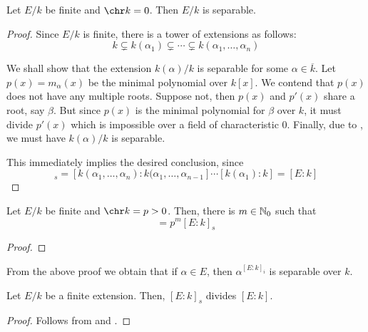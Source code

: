 \begin{theorem}
    Let $E/k$ be finite and $\chr k = 0$. Then $E/k$ is separable.
\end{theorem}
\begin{proof}
    Since $E/k$ is finite, there is a tower of extensions as follows: 
    \begin{equation*}
        k\subsetneq k(\alpha_1)\subsetneq\cdots\subsetneq k(\alpha_1,\ldots,\alpha_n)
    \end{equation*}

    We shall show that the extension $k(\alpha)/k$ is separable for some $\alpha\in\overline{k}$. Let $p(x) = m_\alpha(x)$ be the minimal polynomial over $k[x]$. We contend that $p(x)$ does not have any multiple roots. Suppose not, then $p(x)$ and $p'(x)$ share a root, say $\beta$. But since $p(x)$ is the minimal polynomial for $\beta$ over $k$, it must divide $p'(x)$ which is impossible over a field of characteristic $0$. Finally, due to , we must have $k(\alpha)/k$ is separable.

    This immediately implies the desired conclusion, since 
    \begin{equation*}
        [E:k]_s = [k(\alpha_1,\ldots,\alpha_n): k(\alpha_1,\ldots,\alpha_{n - 1}]\cdots[k(\alpha_1): k] = [E:k]
    \end{equation*}
\end{proof}

\begin{theorem}
    Let $E/k$ be finite and $\chr k = p > 0$. Then, there is $m\in\mathbb{N}_0$ such that 
    \begin{equation*}
        [E:k] = p^m[E:k]_s
    \end{equation*}
\end{theorem}
\begin{proof}
    
\end{proof}

\begin{remark}
    From the above proof we obtain that if $\alpha\in E$, then $\alpha^{[E:k]_i}$ is separable over $k$.
\end{remark}

\begin{corollary}
    Let $E/k$ be a finite extension. Then, $[E:k]_s$ divides $[E:k]$. 
\end{corollary}
\begin{proof}
    Follows from  and .
\end{proof}

